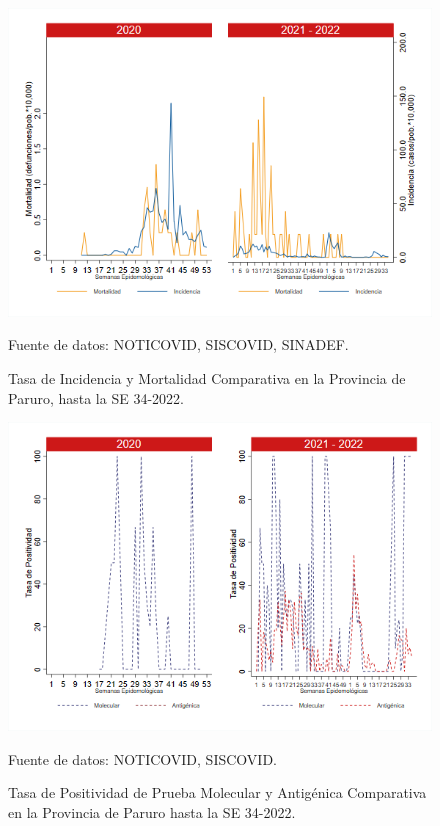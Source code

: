\documentclass[12pt,a4paper,openany]{book}
\begin{document}
	\begin{figure}[h]
		\caption{Tasa de Incidencia y Mortalidad Comparativa en la Provincia de Paruro, hasta la SE 34-2022.}\label{fig:inc_mort_paruro}
		\begin{center}
			\includegraphics[width=0.85\linewidth]{../figuras/incidencia_mortalidad_20_21_10.png}
		\end{center}
		{\footnotesize {Fuente de datos: NOTICOVID, SISCOVID, SINADEF.}} 
	\end{figure}
	
	\begin{figure}[h]
		\caption{Tasa de Positividad de Prueba Molecular y Antigénica Comparativa en la Provincia de Paruro hasta la SE 34-2022.}\label{fig:positividad_paruro}
		\begin{center}
			\includegraphics[width=0.7\linewidth]{../figuras/positividad_20_21_10.png}
		\end{center}
		{\footnotesize {Fuente de datos: NOTICOVID, SISCOVID.}}
	\end{figure}
	
\end{document}

